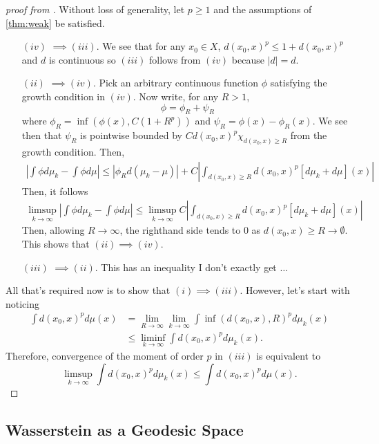 \documentclass[12pt]{article}
\theoremstyle{plain}
\numberwithin{equation}{section}
\begin{document}
\begin{proof}[proof from \cite{villani}]
  Without loss of generality, let $p\ge 1$ and the assumptions of \autoref{thm:weak} be satisfied.
  \begin{enumerate}
    \item[$(iv)$] $\implies (iii)$. We see that for any $x_0\in X$, $d(x_0,x)^p \le 1+d(x_0,x)^p$ and $d$ is continuous so $(iii)$ follows from $(iv)$ because $|d| = d$.
    \item[$(ii)$] $\implies (iv)$. Pick an arbitrary continuous function $\phi$ satisfying the growth condition in $(iv)$. Now write, for any $R > 1$,
    \[\phi = \phi_R + \psi_R\]
    where $\phi_R = \inf(\phi(x), C(1+R^p))$ and $\psi_R = \phi(x) - \phi_R(x)$. We see then that $\psi_R$ is pointwise bounded by $C d(x_0,x)^p\chi_{d(x_0,x) \ge R}$ from the growth condition. Then, 
    \begin{align*}
      \left|\int \phi d\mu_k - \int \phi d\mu\right| \le \left|\phi_Rd(\mu_k - \mu)\right| + C\left|\int_{d(x_0,x) \ge R}d(x_0,x)^p[d\mu_k + d\mu](x)\right|
    \end{align*}
    Then, it follows 
    \begin{align*}
      \limsup_{k\to\infty}\left|\int \phi d\mu_k - \int \phi d\mu\right| \le \limsup_{k\to\infty}C\left|\int_{d(x_0,x) \ge R}d(x_0,x)^p[d\mu_k + d\mu](x)\right|
    \end{align*}
    Then, allowing $R\to\infty$, the righthand side tends to 0 as $d(x_0,x) \ge R \to \emptyset$. This shows that $(ii)\implies (iv)$.
    \item[$(iii)$] $\implies (ii)$. This has an inequality I don't exactly get $\dots$ 
  \end{enumerate}
  All that's required now is to show that $(i)\implies(iii)$. However, let's start with noticing 
  \begin{align*}
    \int d(x_0,x)^pd\mu(x) &= \lim_{R\to\infty}\lim_{k\to\infty} \int\inf(d(x_0,x),R)^pd\mu_k(x) \\
    &\le \liminf_{k\to\infty}\int d(x_0,x)^pd\mu_k(x).
  \end{align*}
  Therefore, convergence of the moment of order $p$ in $(iii)$ is equivalent to 
  \begin{equation}
    \limsup_{k\to\infty}\int d(x_0,x)^pd\mu_k(x)\le \int d(x_0,x)^pd\mu(x).
  \end{equation}
\end{proof}
\subsection{Wasserstein as a Geodesic Space}
\end{document}
